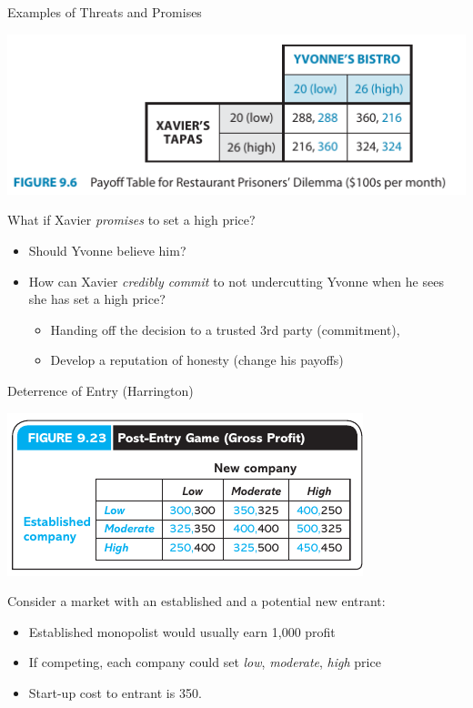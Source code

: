 
\begin{frame}{Examples of Threats and Promises}
  \begin{center}
    \includegraphics[width=.6\textwidth]{figures/fig96.png} 
  \end{center}
  What if Xavier \textit{promises} to set a high price?
  \begin{itemize}
    \item Should Yvonne believe him? 
    \item How can Xavier \textit{credibly commit} to not undercutting Yvonne when he sees she has set a high price?
    \begin{itemize}
      \item Handing off the decision to a trusted 3rd party (commitment),
      \item Develop a reputation of honesty (change his payoffs)
    \end{itemize}
  \end{itemize}
\end{frame}


\begin{frame}{Deterrence of Entry (Harrington)}
  \begin{center}
    \includegraphics[width=.6\textwidth]{figures/fig923.png} 
  \end{center}
  Consider a market with an established and a potential new entrant:
  \vspace{-5mm}
  \begin{itemize}
    \item Established monopolist would usually earn 1,000 profit 
    \item If competing, each company could set \textit{low}, \textit{moderate}, \textit{high} price
    \item Start-up cost to entrant is 350.
  \end{itemize}
\end{frame}

